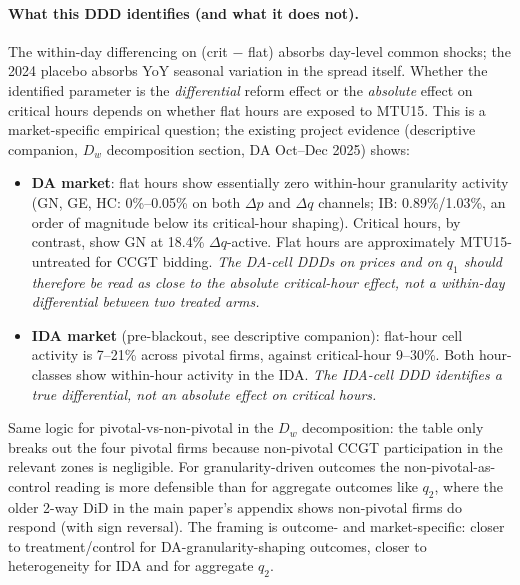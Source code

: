 \documentclass[11pt,a4paper]{article}
\begin{document}
\paragraph{What this DDD identifies (and what it does not).}
The within-day differencing on (crit $-$ flat) absorbs day-level common shocks; the 2024 placebo absorbs YoY seasonal variation in the spread itself. Whether the identified parameter is the \emph{differential} reform effect or the \emph{absolute} effect on critical hours depends on whether flat hours are exposed to MTU15. This is a market-specific empirical question; the existing project evidence (descriptive companion, $D_w$ decomposition section, DA Oct--Dec 2025) shows:
\begin{itemize}
    \item \textbf{DA market}: flat hours show essentially zero within-hour granularity activity (GN, GE, HC: 0\%--0.05\% on both $\Delta p$ and $\Delta q$ channels; IB: 0.89\%/1.03\%, an order of magnitude below its critical-hour shaping). Critical hours, by contrast, show GN at 18.4\% $\Delta q$-active. Flat hours are approximately MTU15-untreated for CCGT bidding. \emph{The DA-cell DDDs on prices and on $q_1$ should therefore be read as close to the absolute critical-hour effect, not a within-day differential between two treated arms.}
    \item \textbf{IDA market} (pre-blackout, see descriptive companion): flat-hour cell activity is 7--21\% across pivotal firms, against critical-hour 9--30\%. Both hour-classes show within-hour activity in the IDA. \emph{The IDA-cell DDD identifies a true differential, not an absolute effect on critical hours.}
\end{itemize}
Same logic for pivotal-vs-non-pivotal in the $D_w$ decomposition: the table only breaks out the four pivotal firms because non-pivotal CCGT participation in the relevant zones is negligible. For granularity-driven outcomes the non-pivotal-as-control reading is more defensible than for aggregate outcomes like $q_2$, where the older 2-way DiD in the main paper's appendix shows non-pivotal firms do respond (with sign reversal). The framing is outcome- and market-specific: closer to treatment/control for DA-granularity-shaping outcomes, closer to heterogeneity for IDA and for aggregate $q_2$.
\end{document}
